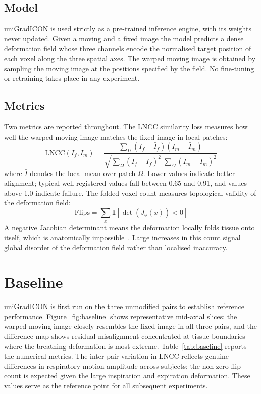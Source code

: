 \documentclass[11pt]{article}
\begin{document}
\subsection{Model}

uniGradICON is used strictly as a pre-trained inference engine, with its
weights never updated. Given a moving and a fixed image the model predicts a
dense deformation field whose three channels encode the normalised target
position of each voxel along the three spatial axes. The warped moving image
is obtained by sampling the moving image at the positions specified by the
field. No fine-tuning or retraining takes place in any experiment.

\subsection{Metrics}

Two metrics are reported throughout. The LNCC similarity loss measures how
well the warped moving image matches the fixed image in local patches:
\begin{equation}
  \mathrm{LNCC}(I_f, I_m) =
  \frac{\displaystyle\sum_\Omega (I_f - \bar{I}_f)(I_m - \bar{I}_m)}
       {\sqrt{\displaystyle\sum_\Omega (I_f-\bar{I}_f)^2\;
              \displaystyle\sum_\Omega (I_m-\bar{I}_m)^2}}
\end{equation}
where $\bar{I}$ denotes the local mean over patch $\Omega$. Lower values
indicate better alignment; typical well-registered values fall between 0.65
and 0.91, and values above 1.0 indicate failure. The folded-voxel count
measures topological validity of the deformation field:
\begin{equation}
  \mathrm{Flips} = \sum_{x}
    \mathbf{1}\!\left[\det\!\left(J_\phi(x)\right) < 0\right]
\end{equation}
A negative Jacobian determinant means the deformation locally folds tissue
onto itself, which is anatomically impossible~\cite{avants2008}. Large increases in this count
signal global disorder of the deformation field rather than localised
inaccuracy.

\section{Baseline}

uniGradICON is first run on the three unmodified pairs to establish reference
performance. Figure~\ref{fig:baseline} shows representative mid-axial slices:
the warped moving image closely resembles the fixed image in all three pairs,
and the difference map shows residual misalignment concentrated at tissue
boundaries where the breathing deformation is most extreme. Table~\ref{tab:baseline}
reports the numerical metrics. The inter-pair variation in LNCC reflects
genuine differences in respiratory motion amplitude across subjects; the
non-zero flip count is expected given the large inspiration and expiration
deformation. These values serve as the reference point for all subsequent
experiments.
\end{document}
